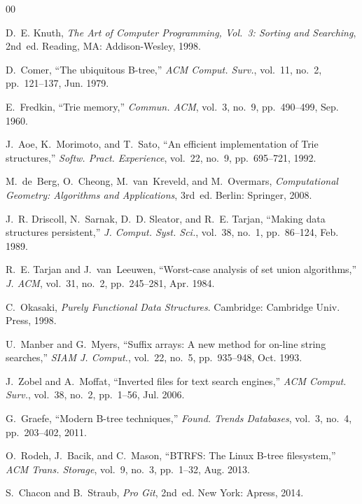 \documentclass[conference]{IEEEtran}
\begin{document}
\begin{thebibliography}{00}

D.~E. Knuth, \textit{The Art of Computer Programming, Vol.~3: Sorting and Searching}, 2nd~ed. Reading, MA: Addison-Wesley, 1998.

D.~Comer, ``The ubiquitous B-tree,'' \textit{ACM Comput. Surv.}, vol.~11, no.~2, pp.~121--137, Jun. 1979.

E.~Fredkin, ``Trie memory,'' \textit{Commun. ACM}, vol.~3, no.~9, pp.~490--499, Sep. 1960.

J.~Aoe, K.~Morimoto, and T.~Sato, ``An efficient implementation of Trie structures,'' \textit{Softw. Pract. Experience}, vol.~22, no.~9, pp.~695--721, 1992.

M.~de~Berg, O.~Cheong, M.~van~Kreveld, and M.~Overmars, \textit{Computational Geometry: Algorithms and Applications}, 3rd~ed. Berlin: Springer, 2008.

J.~R. Driscoll, N.~Sarnak, D.~D. Sleator, and R.~E. Tarjan, ``Making data structures persistent,'' \textit{J. Comput. Syst. Sci.}, vol.~38, no.~1, pp.~86--124, Feb. 1989.

R.~E. Tarjan and J.~van~Leeuwen, ``Worst-case analysis of set union algorithms,'' \textit{J. ACM}, vol.~31, no.~2, pp.~245--281, Apr. 1984.

C.~Okasaki, \textit{Purely Functional Data Structures}. Cambridge: Cambridge Univ. Press, 1998.

U.~Manber and G.~Myers, ``Suffix arrays: A new method for on-line string searches,'' \textit{SIAM J. Comput.}, vol.~22, no.~5, pp.~935--948, Oct. 1993.

J.~Zobel and A.~Moffat, ``Inverted files for text search engines,'' \textit{ACM Comput. Surv.}, vol.~38, no.~2, pp.~1--56, Jul. 2006.

G.~Graefe, ``Modern B-tree techniques,'' \textit{Found. Trends Databases}, vol.~3, no.~4, pp.~203--402, 2011.

O.~Rodeh, J.~Bacik, and C.~Mason, ``BTRFS: The Linux B-tree filesystem,'' \textit{ACM Trans. Storage}, vol.~9, no.~3, pp.~1--32, Aug. 2013.

S.~Chacon and B.~Straub, \textit{Pro Git}, 2nd~ed. New York: Apress, 2014.


\end{thebibliography}
\end{document}
